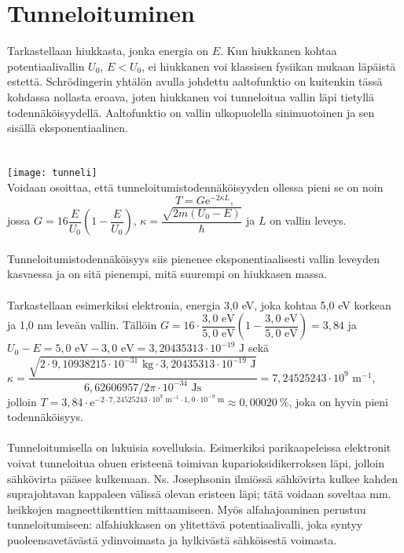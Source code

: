 \documentclass{article}
\begin{document}
\section{Tunneloituminen}
Tarkastellaan hiukkasta, jonka energia on \(E\). Kun hiukkanen kohtaa potentiaalivallin \(U_0\), \(E<U_0\), ei hiukkanen voi klassisen fysiikan mukaan läpäistä estettä. Schrödingerin yhtälön avulla johdettu aaltofunktio on kuitenkin tässä kohdassa nollasta eroava, joten hiukkanen voi tunneloitua vallin läpi tietyllä todennäköisyydellä. Aaltofunktio on vallin ulkopuolella sinimuotoinen ja sen sisällä eksponentiaalinen.\\
 \\
 \\
\texttt{[image: tunneli]}
 \\
Voidaan osoittaa, että tunneloitumistodennäköisyyden ollessa pieni se on noin $$T=G\text{e}^{-2\kappa L},$$ jossa \(G=16 \dfrac{E}{U_0} \left (1-\dfrac{E}{U_0}\right )\), \(\kappa=\dfrac{\sqrt{2m(U_0-E)}}{\hbar}\) ja \(L\) on vallin leveys.\\
 \\
Tunneloitumistodennäköisyys siis pienenee eksponentiaalisesti vallin leveyden kasvaessa ja on sitä pienempi, mitä suurempi on hiukkasen massa.\\
 \\
Tarkastellaan esimerkiksi elektronia, energia 3,0 eV, joka kohtaa 5,0 eV korkean ja 1,0 nm leveän vallin. Tällöin \(G=16\cdot \dfrac{3,0\text{ eV}}{5,0\text{ eV}}\left (1-\dfrac{3,0\text{ eV}}{5,0\text{ eV}}\right )=3,84\) ja \(U_0-E=5,0\text{ eV}-3,0\text{ eV}=3,20435313\cdot 10^{-19}\text{ J}\) sekä \(\kappa =\dfrac{\sqrt{2\cdot 9,10938215\cdot 10^{-31}\text{ kg}\cdot 3,20435313\cdot 10^{-19}\text{ J}}}{6,62606957/2\pi \cdot 10^{-34}\text{ Js}}=7,24525243\cdot 10^{9}\text{ m}^{-1}\), jolloin \(T=3,84\cdot \text{e}^{-2\cdot 7,24525243\cdot 10^{9}\text{ m}^{-1}\cdot 1,0\cdot 10^{-9}\text{ m}}\approx 0,00020 \ \%\), joka on hyvin pieni todennäköisyys.\\
 \\
Tunneloitumisella on lukuisia sovelluksia. Esimerkiksi parikaapeleissa elektronit voivat tunneloitua ohuen eristeenä toimivan kuparioksidikerroksen läpi, jolloin sähkövirta pääsee kulkemaan. Ns. Josephsonin ilmiössä sähkövirta kulkee kahden suprajohtavan kappaleen välissä olevan eristeen läpi; tätä voidaan soveltaa mm. heikkojen magneettikenttien mittaamiseen. Myös alfahajoaminen perustuu tunneloitumiseen: alfahiukkasen on ylitettävä potentiaalivalli, joka syntyy puoleensavetävästä ydinvoimasta ja hylkivästä sähköisestä voimasta.
\end{document}
